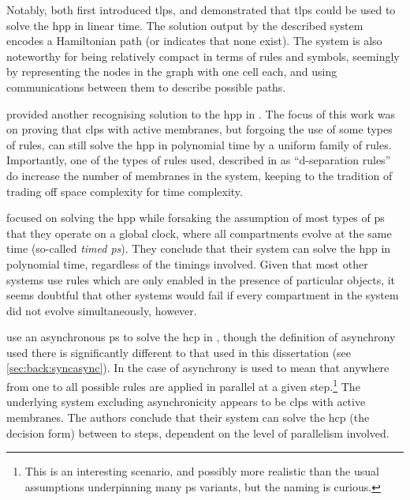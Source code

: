 
Notably, \cite{Martin-Vide2003} both first introduced \gls{tlps}, and demonstrated that \gls{tlps} could be used to solve the \gls{hpp} in linear time.  The solution output by the described system encodes a Hamiltonian path (or indicates that none exist).  The system is also noteworthy for being relatively compact in terms of rules and symbols, seemingly by representing the nodes in the graph with one cell each, and using communications between them to describe possible paths.


\citeauthor{Pan2006} provided another recognising solution to the \gls{hpp} in \cite{Pan2006}.  The focus of this work was on proving that \gls{clps} with active membranes, but forgoing the use of some types of rules, can still solve the \gls{hpp} in polynomial time by a uniform family of rules.  Importantly, one of the types of rules used, described in \cite{Pan2006} as ``d-separation rules'' do increase the number of membranes in the system, keeping to the tradition of trading off space complexity for time complexity.


\citeauthor{Song2013} \cite{Song2013} focused on solving the \gls{hpp} while forsaking the assumption of most types of \gls{ps} that they operate on a global clock, where all \glspl{compartment} evolve at the same time (so-called \emph{timed \gls{ps}}).  They conclude that their system can solve the \gls{hpp} in polynomial time, regardless of the timings involved.  Given that most other systems use rules which are only enabled in the presence of particular objects, it seems doubtful that other systems would fail if every \gls{compartment} in the system did not evolve simultaneously, however.


\citeauthor{Tagawa2012} use an asynchronous \gls{ps} to solve the \gls{hcp} in \cite{Tagawa2012}, though the definition of asynchrony used there is significantly different to that used in this dissertation (see \vref{sec:back:syncasync}).  In the case of \cite{Tagawa2012} asynchrony is used to mean that anywhere from one to all possible rules are applied in parallel at a given step.\footnote{This is an interesting scenario, and possibly more realistic than the usual assumptions underpinning many \gls{ps} variants, but the naming is curious.}  The underlying system excluding asynchronicity appears to be \gls{clps} with active membranes.  The authors conclude that their system can solve the \gls{hcp} (the decision form) between  to  steps, dependent on the level of parallelism involved.

